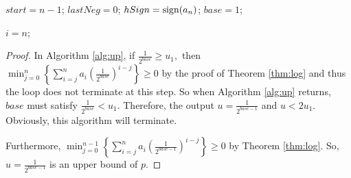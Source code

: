 \begin{algorithm}[H]\label{alg:up}
\caption{\up}
\DontPrintSemicolon
{}
$start=n-1$;
$lastNeg=0$;
$hSign={\rm sign}(a_n)$;
$base=1$;\;



$i=n$;\;

\end{algorithm}

\begin{proof}
  In Algorithm \ref{alg:up}, if  $\frac{1}{2^{base}}\ge u_1,$ then $\min_{j=0}^{n}\left\{ \sum_{i=j}^na_i\left( {\frac{1}{2^{base}} }
  \right)^{i-j}\right \}\ge 0$ by the proof of Theorem \ref{thm:log} and thus %
  the loop does not terminate at this step.
  So when Algorithm \ref{alg:up} returns, $base$ must satisfy $\frac{1}{2^{base}}<u_1$. Therefore, the output $u=\frac{1}{2^{base-1}}$ and $u<2u_1$.
  Obviously, this algorithm will terminate.

  Furthermore,  $\min_{j=0}^{n-1}\left\{ \sum_{i=j}^na_i\left( {\frac{1}{2^{base-1}} } \right)^{i-j}\right \}\ge 0$ by Theorem \ref{thm:log}. So, $u=\frac{1}{2^{base-1}}$ is an upper bound of $p$.
\end{proof}


